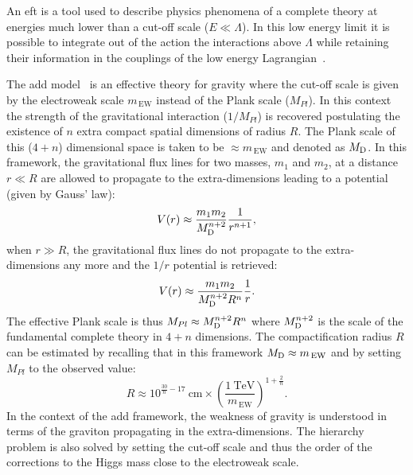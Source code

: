 An \gls{eft} is a tool used to describe physics phenomena of a complete theory
at energies much lower than a cut-off scale ($E \ll \Lambda$). In this low
energy limit it is possible to integrate out of the action the interactions
above $\Lambda$ while retaining their information in the couplings of the low
energy Lagrangian~\cite{EFTReview}.

The \gls{add} model~\cite{ADDPaper} is an effective theory for gravity where the
cut-off scale is given by the electroweak scale $m_\mathrm{\, EW}$ instead of
the Plank scale ($M_{Pl}$). In this context the strength of the gravitational
interaction ($1/M_{Pl}$) is recovered postulating the existence of $n$ extra
compact spatial dimensions of radius $R$. The Plank scale of this ($4 + n$)
dimensional space is taken to be $\approx m_\mathrm{\, EW}$ and denoted as
$M_\mathrm{D}$. In this framework, the gravitational flux lines for two masses, $m_1$ and
$m_2$, at a distance $r \ll R$ are allowed to propagate to the extra-dimensions
leading to a potential (given by Gauss' law):
\begin{equation}
  \label{eq:108}
  V(r) \approx \frac{m_1 m_2}{M_\mathrm{D}^{n + 2}} \frac{1}{r^{n + 1}},
\end{equation}
when $r \gg R$, the gravitational flux lines do not propagate to the
extra-dimensions any more and the $1/r$ potential is retrieved:
\begin{equation}
  \label{eq:109}
  V(r) \approx \frac{m_1 m_2}{M_\mathrm{D}^{n + 2} R^n} \frac{1}{r}.
\end{equation}
The effective Plank scale is thus $M_{Pl} \approx M_\mathrm{D}^{n + 2} R^n$ where
$M_\mathrm{D}^{n + 2}$ is the scale of the fundamental complete theory in $4 + n$
dimensions. The compactification radius $R$ can be estimated by recalling that
in this framework $M_\mathrm{D} \approx m_\mathrm{\, EW}$ and by setting $M_{Pl}$ to the
observed value:
\begin{equation}
  \label{eq:110}
  R \approx 10^{\frac{30}{n} - 17}~\mathrm{cm} \times \left(
    \frac{1~\mathrm{TeV}}{m_\mathrm{\, EW}} \right)^{1 + \frac{2}{n}}.
\end{equation}
In the context of the \gls{add} framework, the weakness of gravity is understood
in terms of the graviton propagating in the extra-dimensions. The hierarchy
problem is also solved by setting the cut-off scale and thus the order of the
corrections to the Higgs mass close to the electroweak scale.
